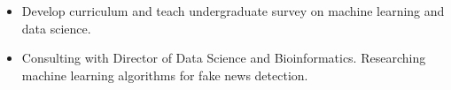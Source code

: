 \documentclass[a4paper,10pt]{memoir} %
\begin{document}
\Sep %




\begin{itemize}
	\item Develop curriculum and teach undergraduate survey on machine learning and data science.
\end{itemize}

\Sep %



\begin{itemize}
	\item Consulting with Director of Data Science and Bioinformatics. Researching machine learning algorithms for fake news detection.
\end{itemize}

\Sep %

\end{document}
